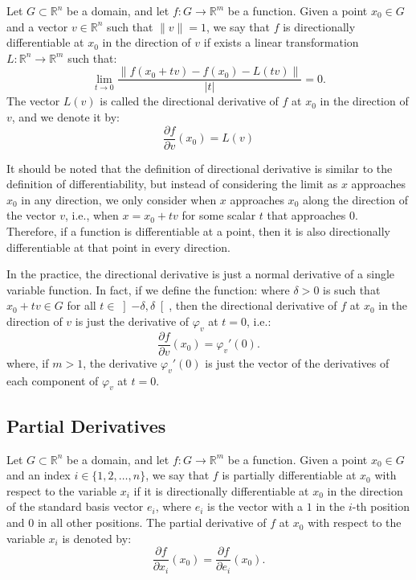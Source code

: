 Let $G\subset \mathbb{R}^n$ be a domain, and let $f : G \to \mathbb{R}^m$ be a function. Given a point $x_0 \in G$ and a vector $v \in \mathbb{R}^n$ such that $\|v\| = 1$, we say that $f$ is directionally differentiable at $x_0$ in the direction of $v$ if exists a linear transformation $L : \mathbb{R}^n \to \mathbb{R}^m$ such that:
\[
    \lim_{t\to 0} \frac{\|f(x_0 + tv) - f(x_0) - L(tv)\|}{|t|} = 0.
\]
The vector $L(v)$ is called the directional derivative of $f$ at $x_0$ in the direction of $v$, and we denote it by:
\begin{equation*}
    \dfrac{\partial f}{\partial v}(x_0) = L(v)
\end{equation*}
\begin{observacion}
    It should be noted that the definition of directional derivative is similar to the definition of differentiability, but instead of considering the limit as $x$ approaches $x_0$ in any direction, we only consider when $x$ approaches $x_0$ along the direction of the vector $v$, i.e., when $x = x_0 + tv$ for some scalar $t$ that approaches $0$. Therefore, if a function is differentiable at a point, then it is also directionally differentiable at that point in every direction.
\end{observacion}

In the practice, the directional derivative is just a normal derivative of a single variable function. In fact, if we define the function:
\Func{\varphi_v}{\left]-\delta, \delta\right[}{\mathbb{R}^m}{t}{f(x_0 + tv)}
where $\delta > 0$ is such that $x_0 + tv \in G$ for all $t \in \left]-\delta, \delta\right[$, then the directional derivative of $f$ at $x_0$ in the direction of $v$ is just the derivative of $\varphi_v$ at $t = 0$, i.e.:
\begin{equation*}
    \dfrac{\partial f}{\partial v}(x_0) = \varphi_v'(0).
\end{equation*}
where, if $m>1$, the derivative $\varphi_v'(0)$ is just the vector of the derivatives of each component of $\varphi_v$ at $t = 0$.

\subsection{Partial Derivatives}

Let $G\subset \mathbb{R}^n$ be a domain, and let $f : G \to \mathbb{R}^m$ be a function. Given a point $x_0 \in G$ and an index $i \in \{1, 2, \dots, n\}$, we say that $f$ is partially differentiable at $x_0$ with respect to the variable $x_i$ if it is directionally differentiable at $x_0$ in the direction of the standard basis vector $e_i$, where $e_i$ is the vector with a $1$ in the $i$-th position and $0$ in all other positions. The partial derivative of $f$ at $x_0$ with respect to the variable $x_i$ is denoted by:
\begin{equation*}
    \frac{\partial f}{\partial x_i}(x_0) = \dfrac{\partial f}{\partial e_i}(x_0).
\end{equation*}

